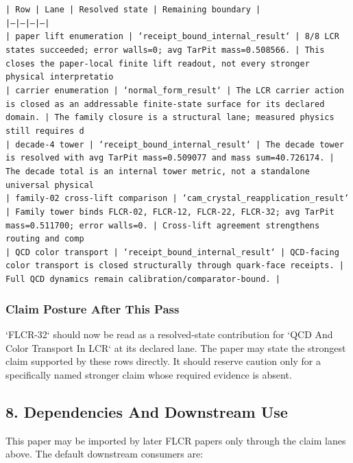 \documentclass[11pt]{article}
\begin{document}
\noindent\texttt{| Row | Lane | Resolved state | Remaining boundary |}\\
\noindent\texttt{|---|---|---|---|}\\
\noindent\texttt{| paper lift enumeration | `receipt\_bound\_internal\_result` | 8/8 LCR states succeeded; error walls=0; avg TarPit mass=0.508566. | This closes the paper-local finite lift readout, not every stronger physical interpretatio}\\
\noindent\texttt{| carrier enumeration | `normal\_form\_result` | The LCR carrier action is closed as an addressable finite-state surface for its declared domain. | The family closure is a structural lane; measured physics still requires d}\\
\noindent\texttt{| decade-4 tower | `receipt\_bound\_internal\_result` | The decade tower is resolved with avg TarPit mass=0.509077 and mass sum=40.726174. | The decade total is an internal tower metric, not a standalone universal physical }\\
\noindent\texttt{| family-02 cross-lift comparison | `cam\_crystal\_reapplication\_result` | Family tower binds FLCR-02, FLCR-12, FLCR-22, FLCR-32; avg TarPit mass=0.511700; error walls=0. | Cross-lift agreement strengthens routing and comp}\\
\noindent\texttt{| QCD color transport | `receipt\_bound\_internal\_result` | QCD-facing color transport is closed structurally through quark-face receipts. | Full QCD dynamics remain calibration/comparator-bound. |}\\

\subsubsection*{Claim Posture After This Pass}

`FLCR-32` should now be read as a resolved-state contribution for `QCD And Color Transport In LCR` at its declared lane. The paper may state the strongest claim supported by these rows directly. It should reserve caution only for a specifically named stronger claim whose required evidence is absent.

\subsection*{8. Dependencies And Downstream Use}

This paper may be imported by later FLCR papers only through the claim lanes
above. The default downstream consumers are:
\end{document}
